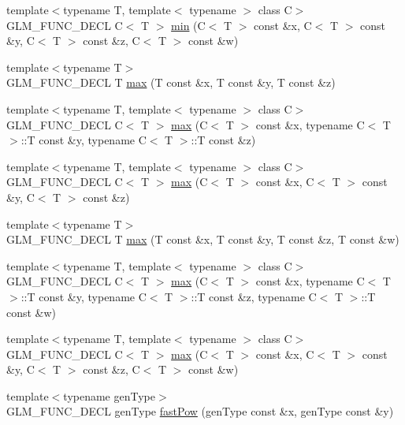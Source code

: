 \begin{CompactItemize}
\item 
{\footnotesize template$<$typename T, template$<$ typename $>$ class C$>$ }\\GLM\_\-FUNC\_\-DECL C$<$ T $>$ \hyperlink{group__gtx__extented__min__max_gca95a5fd4be0ad53f4474e69867bf974}{min} (C$<$ T $>$ const \&x, C$<$ T $>$ const \&y, C$<$ T $>$ const \&z, C$<$ T $>$ const \&w)
\item 
{\footnotesize template$<$typename T$>$ }\\GLM\_\-FUNC\_\-DECL T \hyperlink{group__gtx__extented__min__max_g15a13c57e770e4e4058140ce507632c0}{max} (T const \&x, T const \&y, T const \&z)
\item 
{\footnotesize template$<$typename T, template$<$ typename $>$ class C$>$ }\\GLM\_\-FUNC\_\-DECL C$<$ T $>$ \hyperlink{group__gtx__extented__min__max_g55d5788e40f5915e95108d2c611fc42e}{max} (C$<$ T $>$ const \&x, typename C$<$ T $>$::T const \&y, typename C$<$ T $>$::T const \&z)
\item 
{\footnotesize template$<$typename T, template$<$ typename $>$ class C$>$ }\\GLM\_\-FUNC\_\-DECL C$<$ T $>$ \hyperlink{group__gtx__extented__min__max_g88f52afea5c8c6d5f3197816cc3f9607}{max} (C$<$ T $>$ const \&x, C$<$ T $>$ const \&y, C$<$ T $>$ const \&z)
\item 
{\footnotesize template$<$typename T$>$ }\\GLM\_\-FUNC\_\-DECL T \hyperlink{group__gtx__extented__min__max_g18e8664b11d2c657cb5990fa2fc32001}{max} (T const \&x, T const \&y, T const \&z, T const \&w)
\item 
{\footnotesize template$<$typename T, template$<$ typename $>$ class C$>$ }\\GLM\_\-FUNC\_\-DECL C$<$ T $>$ \hyperlink{group__gtx__extented__min__max_gad13af3c32f9a925e4ef4276bcf37ab7}{max} (C$<$ T $>$ const \&x, typename C$<$ T $>$::T const \&y, typename C$<$ T $>$::T const \&z, typename C$<$ T $>$::T const \&w)
\item 
{\footnotesize template$<$typename T, template$<$ typename $>$ class C$>$ }\\GLM\_\-FUNC\_\-DECL C$<$ T $>$ \hyperlink{group__gtx__extented__min__max_g56246e6ce859dc617425497eab1bdbd8}{max} (C$<$ T $>$ const \&x, C$<$ T $>$ const \&y, C$<$ T $>$ const \&z, C$<$ T $>$ const \&w)
\item 
{\footnotesize template$<$typename genType$>$ }\\GLM\_\-FUNC\_\-DECL genType \hyperlink{group__gtx__fast__exponential_g399b134d7015729817135440eb047d5a}{fastPow} (genType const \&x, genType const \&y)

\end{CompactItemize}
